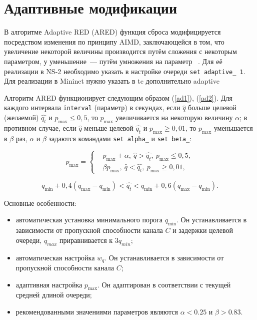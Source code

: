 \section{Адаптивные модификации}
\label{chap2:sec3}

В алгоритме Adaptive RED (ARED) функция сброса модифицируется
посредством изменения по принципу AIMD, заключающейся в том, что
увеличение некоторой величины производится путём сложения с некоторым
параметром, у уменьшение~--- путём умножения на
параметр ~\cite{ARED}. Для её реализации в NS-2 необходимо указать в
настройке очереди \verb|set adaptive_ 1|. Для реализации в Mininet нужно указать в tc дополнительно adaptive

Алгоритм ARED функционирует следующим образом (\eqref{ad1}),
(\eqref{ad2}). Для каждого интервала \verb|interval| (параметр) в
секундах, если $\hat{q}$ больше целевой (желаемой) $\hat{q_t}$ и
$p_{\max} \leqslant 0,5$, то $p_{\max}$ увеличивается на некоторую
величину $\alpha$; в противном случае, если $\hat{q}$ меньше целевой
$\hat{q_t}$ и $p_{\max}\geqslant 0,01$, то $p_{\max}$ уменьшается в
$\beta$ раз, $\alpha$ и $\beta$ задаются командами \verb|set alpha_| и \verb|set beta_|:

\begin{equation}
\label{ad1}
p_{\max} = \left\{
  \begin{aligned}
    & p_{\max}+\alpha, \ \hat{q}>\hat{q_{t}}, \ p_{\max} \leqslant 0,5, \\
    & \beta p_{\max}, \ \hat{q}<\hat{q_{t}}, \ p_{\max} \geqslant 0,01, 
  \end{aligned}
\right.
\end{equation}

\begin{equation}
\label{ad2}
q_{\min}+0,4(q_{\max}-q_{\min}) < \hat{q_t} < q_{\min}+0,6\left(q_{\max}-q_{\min}\right).
\end{equation}

Основные особенности: 
\begin{itemize}
\item автоматическая установка минимального порога $q_{\min}$. Он
  устанавливается в зависимости от пропускной способности канала $C$ и
  задержки целевой очереди, $q_{max}$ приравнивается к $3q_{min}$;
\item автоматическая настройка $w_{q}$. Он устанавливается в
  зависимости от пропускной способности канала $C$;
\item адаптивная настройка $p_{\max}$. Он адаптирован в соответствии с
  текущей средней длиной очереди;
\item рекомендованными значениями параметров являются $\alpha < 0.25 $ и $\beta > 0.83 $.
\end{itemize}


